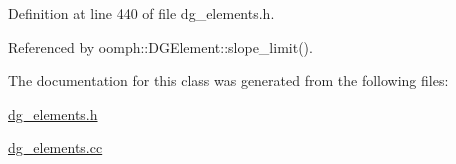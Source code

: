 Definition at line 440 of file dg\+\_\+elements.\+h.



Referenced by oomph\+::\+D\+G\+Element\+::slope\+\_\+limit().



The documentation for this class was generated from the following files\+:\begin{DoxyCompactItemize}
\item 
\hyperlink{dg__elements_8h}{dg\+\_\+elements.\+h}\item 
\hyperlink{dg__elements_8cc}{dg\+\_\+elements.\+cc}\end{DoxyCompactItemize}
